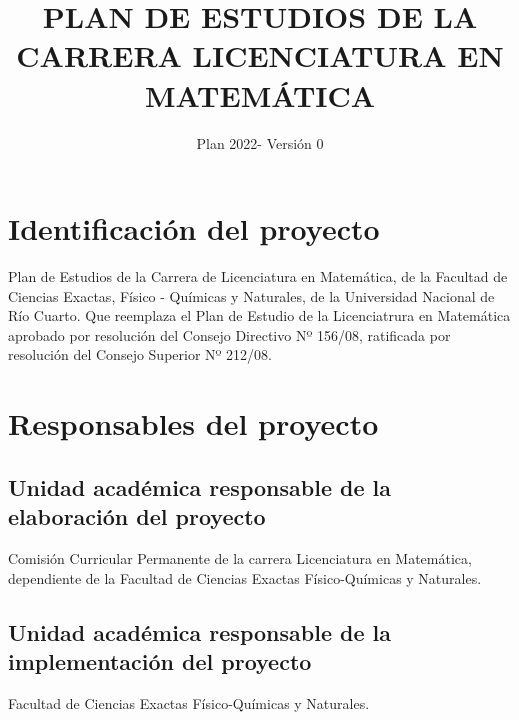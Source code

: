 \documentclass[a4paper, 12pt]{article}
\begin{document}
\title{PLAN DE ESTUDIOS DE LA CARRERA LICENCIATURA EN MATEMÁTICA}
\author{Plan 2022- Versión 0}
\date{}
 \maketitle

 \newpage



\tableofcontents

\newpage


\section{Identificación del proyecto}  

Plan de Estudios de la 
Carrera de Licenciatura en Matemática, de la Facultad de Ciencias Exactas, 
Físico - Químicas y Naturales, de la Universidad Nacional de Río Cuarto. Que reemplaza el Plan de Estudio de la Licenciatrura en Matemática aprobado por resolución del Consejo Directivo Nº 156/08, 
ratificada por resolución del Consejo Superior Nº 212/08.

\section{Responsables del proyecto}

\subsection{Unidad académica responsable de la elaboración del proyecto}

Comisión Curricular Permanente de la carrera Licenciatura en Matemática, dependiente de 
la Facultad de Ciencias Exactas Físico-Químicas y Naturales.

\subsection{Unidad académica responsable de la implementación del proyecto}

Facultad de Ciencias Exactas Físico-Químicas y Naturales.
\end{document}
